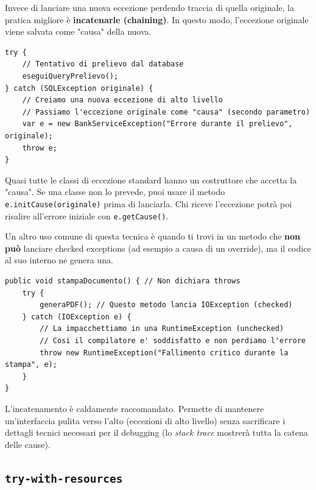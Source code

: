 Invece di lanciare una nuova eccezione perdendo traccia di quella originale, la pratica migliore è \textbf{incatenarle (chaining)}. In questo modo, l'eccezione originale viene salvata come "causa" della nuova.

\begin{lstlisting}[caption={Esempio di Exception Chaining}]
try {
    // Tentativo di prelievo dal database
    eseguiQueryPrelievo(); 
} catch (SQLException originale) {
    // Creiamo una nuova eccezione di alto livello
    // Passiamo l'eccezione originale come "causa" (secondo parametro)
    var e = new BankServiceException("Errore durante il prelievo", originale);
    throw e;
}
\end{lstlisting}

\begin{tip}
Quasi tutte le classi di eccezione standard hanno un costruttore che accetta la "causa". Se una classe non lo prevede, puoi usare il metodo \texttt{e.initCause(originale)} prima di lanciarla. Chi riceve l'eccezione potrà poi risalire all'errore iniziale con \texttt{e.getCause()}.
\end{tip}

Un altro uso comune di questa tecnica è quando ti trovi in un metodo che \textbf{non può} lanciare checked exceptions (ad esempio a causa di un override), ma il codice al suo interno ne genera una.

\begin{lstlisting}[caption={Da Checked a Unchecked}]
public void stampaDocumento() { // Non dichiara throws
    try {
        generaPDF(); // Questo metodo lancia IOException (checked)
    } catch (IOException e) {
        // La impacchettiamo in una RuntimeException (unchecked)
        // Cosi il compilatore e' soddisfatto e non perdiamo l'errore
        throw new RuntimeException("Fallimento critico durante la stampa", e);
    }
}
\end{lstlisting}

\begin{bestpractice}
L'incatenamento è caldamente raccomandato. Permette di mantenere un'interfaccia pulita verso l'alto (eccezioni di alto livello) senza sacrificare i dettagli tecnici necessari per il debugging (lo \textit{stack trace} mostrerà tutta la catena delle cause).
\end{bestpractice}

\subsection{\texttt{try-with-resources}}

